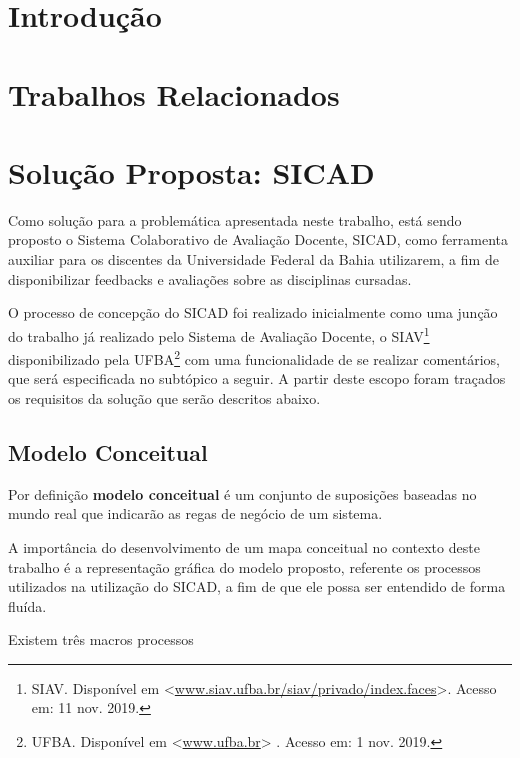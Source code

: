 \documentclass[12pt, a4paper]{report}
\begin{document}
\listoffigures
\cleardoublepage


\listoftables
\cleardoublepage

\chapter{Introdução}

\chapter {Trabalhos Relacionados}

\chapter{Solução Proposta: SICAD}
\par Como solução para a problemática apresentada neste trabalho, está sendo proposto o Sistema Colaborativo de Avaliação Docente, SICAD, como ferramenta auxiliar para os discentes da Universidade Federal da Bahia utilizarem, a fim de disponibilizar feedbacks e avaliações sobre as disciplinas cursadas. 
\par O processo de concepção do SICAD foi realizado inicialmente como uma junção do trabalho já realizado pelo Sistema de Avaliação Docente, o SIAV\footnote{SIAV. Disponível em <\url{www.siav.ufba.br/siav/privado/index.faces}>. Acesso em: 11 nov. 2019.} disponibilizado pela UFBA\footnote{UFBA. Disponível em <\url{www.ufba.br}> . Acesso em: 1 nov. 2019.} com uma funcionalidade de se realizar comentários, que será especificada no subtópico a seguir. A partir deste escopo foram traçados os requisitos da solução que serão descritos abaixo.

\section{ Modelo Conceitual}
\par 
Por definição \textbf{modelo conceitual} é um conjunto de suposições baseadas no mundo real que indicarão as regas de negócio de um sistema\cite{mapaconceitual}.
\par A importância do desenvolvimento de um mapa conceitual no contexto deste trabalho é a representação gráfica do modelo proposto, referente os processos utilizados na utilização do SICAD, a fim de que ele possa ser entendido de forma fluída.
\par Existem três macros processos   
\end{document}
